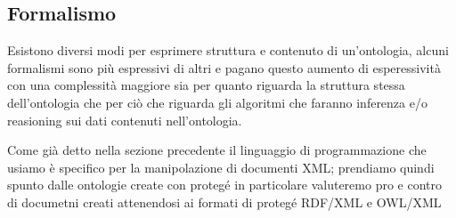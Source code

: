 	\subsection{Formalismo}
		Esistono diversi modi per esprimere struttura e contenuto di un'ontologia, alcuni formalismi sono più espressivi di altri e pagano questo aumento di esperessività con una complessità maggiore sia per quanto riguarda la struttura stessa dell'ontologia che per ciò che riguarda gli algoritmi che faranno inferenza e/o reasioning sui dati contenuti nell'ontologia.
		
		Come già detto nella sezione precedente il linguaggio di programmazione che usiamo è specifico per la manipolazione di documenti XML; prendiamo quindi spunto dalle ontologie create con protegé in particolare valuteremo pro e contro di documetni creati attenendosi ai formati di protegé RDF/XML e  OWL/XML